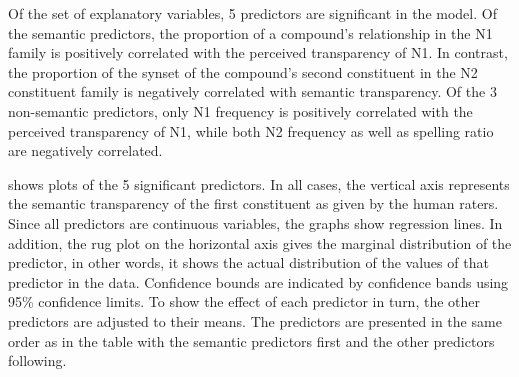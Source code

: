 Of the set of explanatory
variables, 5 predictors are significant in the model. Of the semantic predictors,
the proportion of a compound's relationship in the N1 family is
positively correlated with the perceived transparency of N1. In
contrast, the proportion of the synset of the compound's second
constituent in the N2 constituent family is negatively correlated with
semantic transparency. Of the 3 non-semantic predictors, only N1
frequency is positively correlated with the perceived transparency of
N1, while both N2 frequency as well as spelling ratio are negatively correlated. 

 shows plots of the 5
significant predictors. In all cases,
the vertical axis represents the semantic transparency of the first
constituent as given by the human raters. Since all predictors are continuous
variables, the graphs show regression lines. In addition, the rug plot on the horizontal axis gives the marginal distribution of the
predictor, in other words, it shows the actual distribution of the
values of that predictor in the data. Confidence bounds are indicated
by confidence bands using 95\% confidence limits. 
To show the effect of
each predictor in turn, the other predictors are adjusted to their
 means. The predictors are presented in the same order as in the table
 with the semantic predictors first and the other predictors following.

